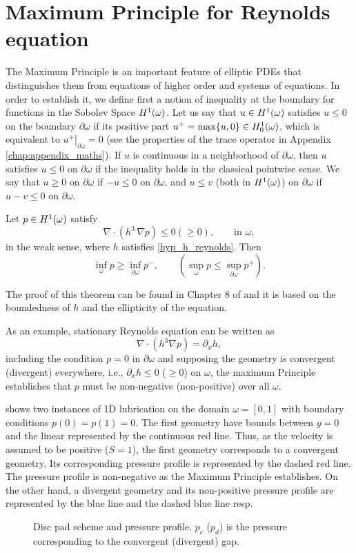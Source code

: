 \section{Maximum Principle for Reynolds equation} The Maximum Principle is an important feature of elliptic PDEs that distinguishes them from equations of higher order and systems of equations. In order to establish it, we define first a notion of inequality at the boundary for functions in the Sobolev Space ${H^1(\omega)}$. Let us say that $u\in {H^1(\omega)}$ satisfies $u\leq 0$ on the boundary $\partial \omega$ if its positive part $u^+=\max\{u,0\}\in {H_0^1(\omega)}$, which is equivalent to $\left.u^+\right|_{\partial\omega}=0$ (see the properties of the trace operator in Appendix \ref{chap:appendix_maths}). If $u$ is continuous in a neighborhood of $\partial \omega$, then $u$ satisfies $u\leq 0$ on $\partial \omega$ if the inequality holds in the classical pointwise sense. We say that $u\geq 0$ on $\partial \omega$ if $-u\leq 0$ on $\partial \omega$, and $u\leq v$ (both in ${H^1(\omega)}$) on $\partial \omega$ if $u-v\leq 0$ on $\partial \omega$.
\begin{theorem}\label{theo:max_princ_reynolds}
Let $p\in {H^1(\omega)}$ satisfy $$\nabla\cdot \left(h^3\,\nabla p\right)\leq 0\left(\geq 0\right),\qquad \text{in }\omega,$$
in the weak sense, where $h$ satisfies \eqref*{hyp_h_reynolds}. Then
$$\inf_{\omega} p \geq \inf_{\partial \omega} p^-,\qquad \left(\sup_{\omega} p \leq \sup_{\partial \omega} p^+\right).$$
\end{theorem}
The proof of this theorem can be found in Chapter 8 of \cite{trudinger1983} and it is based on the boundedness of $h$ and the ellipticity of the equation. 

As an example, stationary Reynolds equation can be written as $$\nabla \cdot \left( h^3\nabla p \right) = \partial_x h,$$
including the condition $p=0$ in $\partial \omega$ and supposing  the geometry is convergent (divergent) everywhere, i.e., $\partial_x h\leq 0$ ($\geq 0$) on $\omega$, the maximum Principle establishes that $p$ must be non-negative (non-positive) over all $\omega$.

 shows two instances of 1D lubrication on the domain $\omega=[0,1]$ with boundary conditions $p(0)=p(1)=0$. The first geometry have bounds between $y=0$ and the linear represented by the continuous red line. Thus, as the velocity is assumed to be positive ($S=1$), the first geometry corresponds to a convergent geometry. Its corresponding pressure profile is represented by the dashed red line. The pressure profile is non-negative as the Maximum Principle establishes. On the other hand, a divergent geometry and its non-positive pressure profile are represented by the blue line and the dashed blue line resp.
 \begin{figure}[h!]
 \centering 
 \def\svgwidth{\textwidth}	\footnotesize{
}
\caption[Disc pad scheme and pressure profile.]{Disc pad scheme and pressure profile. $p_c$ ($p_d$) is the pressure corresponding to the convergent (divergent) gap.}\label{fig:ex_conv_div_geo}
\end{figure}

